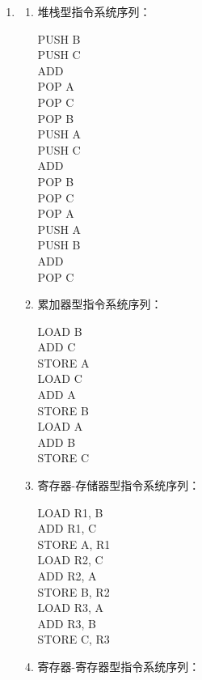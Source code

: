 \documentclass[UTF8]{article}
\begin{document}
\begin{enumerate}[label=(\arabic*)]
    \item 
    \begin{enumerate}
        \item 堆栈型指令系统序列：
        
        PUSH B \\
        PUSH C \\
        ADD \\
        POP A \\
        POP C \\
        POP B \\
        PUSH A \\
        PUSH C \\
        ADD \\
        POP B \\
        POP C \\
        POP A \\
        PUSH A \\
        PUSH B \\
        ADD \\
        POP C
        \item 累加器型指令系统序列：
        
        LOAD B \\
        ADD C \\
        STORE A \\
        LOAD C \\
        ADD A \\
        STORE B \\
        LOAD A \\
        ADD B \\
        STORE C
        \item 寄存器-存储器型指令系统序列：
        
        LOAD R1, B \\
        ADD R1, C \\
        STORE A, R1 \\
        LOAD R2, C \\
        ADD R2, A \\
        STORE B, R2 \\
        LOAD R3, A \\
        ADD R3, B \\
        STORE C, R3

        \item 寄存器-寄存器型指令系统序列：
        

\end{enumerate}
\end{enumerate}
\end{document}
